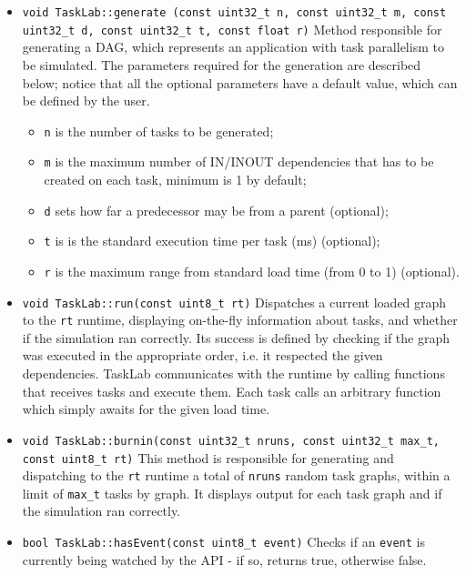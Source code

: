 \begin{itemize}
\item \texttt{\noindent void TaskLab::generate \newline
(const uint32\_t n, const uint32\_t m, const uint32\_t d, \newline
 const uint32\_t t, const float r)} \newline
Method responsible for generating a DAG, which represents an application with task parallelism to be simulated. The parameters required for the generation are described below; notice that all the optional parameters have a default value, which can be defined by the user.
\begin{itemize}
\item \texttt{n} is the number of tasks to be generated; 
\item \texttt{m} is the maximum number of IN/INOUT dependencies that has to be created on each task, minimum is 1 by default; 
\item \texttt{d} sets how far a predecessor may be from a parent (optional); 
\item \texttt{t} is is the standard execution time per task (ms) (optional); 
\item \texttt{r} is the maximum range from standard load time (from 0 to 1) (optional). 
\end{itemize}

\item \texttt{void TaskLab::run(const uint8\_t rt)} \newline
Dispatches a current loaded graph to the \texttt{rt} runtime, displaying on-the-fly information about tasks, and whether if the simulation ran correctly. Its success is defined by checking if the graph was executed in the appropriate order, i.e. it respected the given dependencies. TaskLab communicates with the runtime by calling functions that receives tasks and execute them. Each task calls an arbitrary function which simply awaits for the given load time.

\item \texttt{void TaskLab::burnin(const uint32\_t nruns, const uint32\_t max\_t, const uint8\_t rt)} \newline
This method is responsible for generating and dispatching to the \texttt{rt} runtime a total of \texttt{nruns} random task graphs, within a limit of \texttt{max\_t} tasks by graph. It displays output for each task graph and if the simulation ran correctly.

\item\texttt{bool TaskLab::hasEvent(const uint8\_t event)} \newline
Checks if an \texttt{event} is currently being watched by the API - if so, returns true, otherwise false.


\end{itemize}
